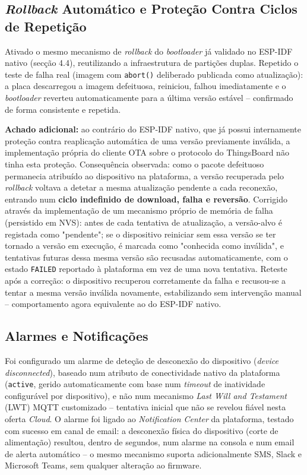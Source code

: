 \documentclass[a4paper,12pt]{article}
\begin{document}
\subsection{\textit{Rollback} Automático e Proteção Contra Ciclos de Repetição}
Ativado o mesmo mecanismo de \textit{rollback} do \textit{bootloader} já validado no ESP-IDF nativo (secção 4.4), reutilizando a infraestrutura de partições duplas. Repetido o teste de falha real (imagem com \texttt{abort()} deliberado publicada como atualização): a placa descarregou a imagem defeituosa, reiniciou, falhou imediatamente e o \textit{bootloader} reverteu automaticamente para a última versão estável -- confirmado de forma consistente e repetida.

\textbf{Achado adicional:} ao contrário do ESP-IDF nativo, que já possui internamente proteção contra reaplicação automática de uma versão previamente inválida, a implementação própria do cliente OTA sobre o protocolo do ThingsBoard não tinha esta proteção. Consequência observada: como o pacote defeituoso permanecia atribuído ao dispositivo na plataforma, a versão recuperada pelo \textit{rollback} voltava a detetar a mesma atualização pendente a cada reconexão, entrando num \textbf{ciclo indefinido de download, falha e reversão}. Corrigido através da implementação de um mecanismo próprio de memória de falha (persistido em NVS): antes de cada tentativa de atualização, a versão-alvo é registada como "pendente"; se o dispositivo reiniciar sem essa versão se ter tornado a versão em execução, é marcada como "conhecida como inválida", e tentativas futuras dessa mesma versão são recusadas automaticamente, com o estado \texttt{FAILED} reportado à plataforma em vez de uma nova tentativa. Reteste após a correção: o dispositivo recuperou corretamente da falha e recusou-se a tentar a mesma versão inválida novamente, estabilizando sem intervenção manual -- comportamento agora equivalente ao do ESP-IDF nativo.

\subsection{Alarmes e Notificações}
Foi configurado um alarme de deteção de desconexão do dispositivo (\textit{device disconnected}), baseado num atributo de conectividade nativo da plataforma (\texttt{active}, gerido automaticamente com base num \textit{timeout} de inatividade configurável por dispositivo), e não num mecanismo \textit{Last Will and Testament} (LWT) MQTT customizado -- tentativa inicial que não se revelou fiável nesta oferta \textit{Cloud}. O alarme foi ligado ao \textit{Notification Center} da plataforma, testado com sucesso em canal de email: a desconexão física do dispositivo (corte de alimentação) resultou, dentro de segundos, num alarme na consola e num email de alerta automático -- o mesmo mecanismo suporta adicionalmente SMS, Slack e Microsoft Teams, sem qualquer alteração ao firmware.
\end{document}

